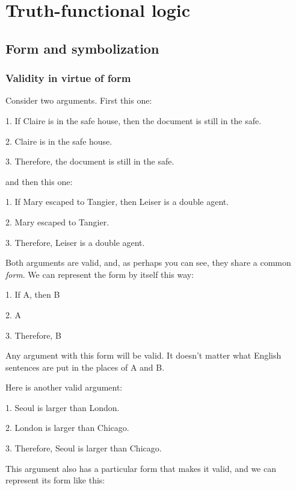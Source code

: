 \part{Truth-functional logic}
\label{ch.TFL}

\chapter{Form and symbolization}\label{symbolization}

\section{Validity in virtue of form}\label{s:ValidityInVirtueOfForm}
Consider two arguments. First this one:
	\begin{earg}
		\item[1.] If Claire is in the safe house, then the document is still in the safe.
		\item[2.] Claire is in the safe house.
		\item[3.] Therefore, the document is still in the safe.
	\end{earg}
and then this one:
	\begin{earg}
		\item[1.] If Mary escaped to Tangier, then Leiser is a double agent.
		\item[2.] Mary escaped to Tangier.
		\item[3.] Therefore, Leiser is a double agent.
	\end{earg}
Both arguments are valid, and, as perhaps you  can see, they share a common \textit{form}. We can represent the form by itself this way:
	\begin{earg}
		\item[1.] If A, then B
		\item[2.] A
		\item[3.] Therefore, B
	\end{earg}
Any argument with this form will be valid. It doesn't matter what English sentences are put in the places of A and B. 

Here is another valid argument:
	\begin{earg}
		\item[1.] Seoul is larger than London.
		\item[2.] London is larger than Chicago.
		\item[3.] Therefore, Seoul is larger than Chicago. 
	\end{earg}
This argument also has a particular form that makes it valid, and we can represent its form like this:
\bigskip

